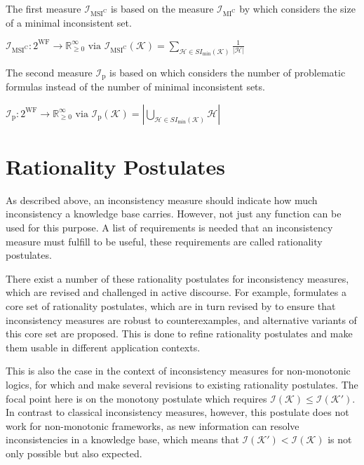 The first measure \(\mathcal{I}_{\text{MSI}^\text{C}}\) is based on the measure \(\mathcal{I}_{\text{MI}^{\text{C}}}\) by \cite{hunter_measuring_2008} which considers the size of a minimal inconsistent set.

\begin{definition}
    \(\mathcal{I}_{\text{MSI}^\text{C}}: 2^{\text{WF}} \rightarrow \mathbb{R}_{\geq 0}^{\infty} \text{ via } \mathcal{I}_{\text{MSI}^\text{C}}(\mathcal{K}) = \sum\limits_{\mathcal{H} \in SI_{\min}(\mathcal{K})} \frac{1}{|\mathcal{H}|}\)
\end{definition}

The second measure \(\mathcal{I}_{\text{p}}\) is based on \cite{liu_measuring_2011} which considers the number of problematic formulas instead of the number of minimal inconsistent sets.

\begin{definition}
    \(\mathcal{I}_{\text{p}}: 2^{\text{WF}} \rightarrow \mathbb{R}_{\geq 0}^{\infty} \text{ via } \mathcal{I}_{\text{p}}(\mathcal{K}) = \left| \bigcup\limits_{\mathcal{H} \in SI_{\min}(\mathcal{K})} \mathcal{H} \right|\)
\end{definition}

\section{Rationality Postulates}
As described above, an inconsistency measure should indicate how much inconsistency a knowledge base carries. However, not just any function can be used for this purpose. A list of requirements is needed that an inconsistency measure must fulfill to be useful, these requirements are called rationality postulates.

There exist a number of these rationality postulates for inconsistency measures, which are revised and challenged in active discourse. For example, \cite{hunter_measure_2010} formulates a core set of rationality postulates, which are in turn revised by \cite{hameurlain_basic_2017} to ensure that inconsistency measures are robust to counterexamples, and alternative variants of this core set are proposed. This is done to refine rationality postulates and make them usable in different application contexts.

This is also the case in the context of inconsistency measures for non-monotonic logics, for which \cite{ulbricht_measuring_2018} and \cite{ulbricht_handling_2020} make several revisions to existing rationality postulates. The focal point here is on the monotony postulate which requires \(\mathcal{I}(\mathcal{K}) \leq \mathcal{I}(\mathcal{K}')\). In contrast to classical inconsistency measures, however, this postulate does not work for non-monotonic frameworks, as new information can resolve inconsistencies in a knowledge base, which means that \(\mathcal{I}(\mathcal{K}') < \mathcal{I}(\mathcal{K})\) is not only possible but also expected.

